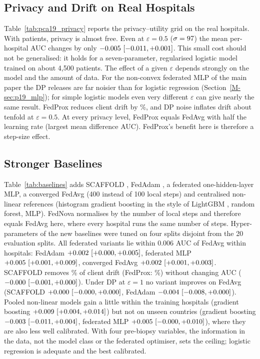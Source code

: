 \subsection{Privacy and Drift on Real Hospitals}
Table~\ref{tab:pca19_privacy} reports the privacy--utility grid on the real hospitals. With \pNineN{} patients, privacy is almost free. Even at $\varepsilon=0.5$ ($\sigma=97$) the mean per-hospital AUC changes by only $-0.005\ [-0.011, +0.001]$. This small cost should not be generalised: it holds for a seven-parameter, regularised logistic model trained on about 4{,}500 patients. The effect of a given $\varepsilon$ depends strongly on the model and the amount of data. For the non-convex federated MLP of the main paper the DP releases are far noisier than for logistic regression (Section~\ref{M-sec:p19_mlp}); for simple logistic models even very different $\varepsilon$ can give nearly the same result. FedProx reduces client drift by \pDriftRed\%, and DP noise inflates drift about tenfold at $\varepsilon=0.5$. At every privacy level, FedProx equals FedAvg with half the learning rate (largest mean difference \pProxHalfMax{} AUC). FedProx's benefit here is therefore a step-size effect.




\subsection{Stronger Baselines}
\label{sec:p19_baselines}
Table~\ref{tab:baselines} adds SCAFFOLD \cite{Karimireddy2020Scaffold}, FedAdam \cite{Reddi2021FedOpt}, a federated one-hidden-layer MLP, a converged FedAvg (400 instead of 100 local steps) and centralised non-linear references (histogram gradient boosting in the style of LightGBM \cite{Ke2017LightGBM}, random forest, MLP). FedNova \cite{Wang2020FedNova} normalises by the number of local steps and therefore equals FedAvg here, where every hospital runs the same number of steps. Hyper-parameters of the new baselines were tuned on four splits disjoint from the 20 evaluation splits. All federated variants lie within 0.006 AUC of FedAvg within hospitals: FedAdam $+0.002\ [+0.000, +0.005]$, federated MLP $+0.005\ [+0.001, +0.009]$, converged FedAvg $+0.002\ [+0.001, +0.003]$. SCAFFOLD removes \blScafDrift\% of client drift (FedProx: \blProxDrift\%) without changing AUC ($-0.000\ [-0.001, +0.000]$). Under DP at $\varepsilon=1$ no variant improves on FedAvg (SCAFFOLD $+0.000\ [-0.000, +0.000]$, FedAdam $-0.004\ [-0.008, +0.000]$). Pooled non-linear models gain a little within the training hospitals (gradient boosting $+0.009\ [+0.004, +0.014]$) but not on unseen countries (gradient boosting $-0.003\ [-0.011, +0.004]$, federated MLP $+0.005\ [-0.000, +0.010]$), where they are also less well calibrated. With four pre-biopsy variables, the information in the data, not the model class or the federated optimiser, sets the ceiling; logistic regression is adequate and the best calibrated.

